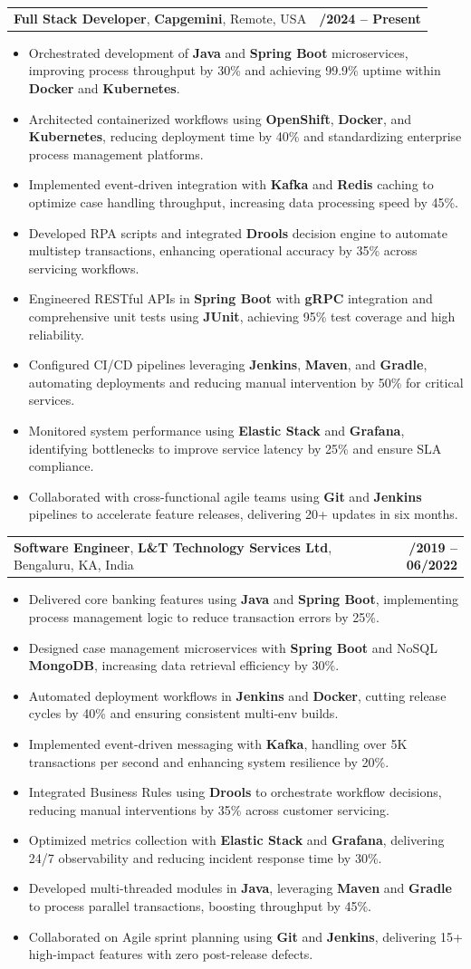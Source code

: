\documentclass[letterpaper,11pt]{article}
\makeatletter
\newcommand{\resumeItem}[1]{
  \item\footnotesize{
    {#1 \vspace{-2pt}}
  }
}
\newcommand{\resumeSubheading}[4]{
  \vspace{-2pt}\item
    \begin{tabular*}{1.0\textwidth}[t]{l@{\extracolsep{\fill}}r}
      \textbf{\fontsize{10pt}{14pt}\selectfont #3}, \textbf{\fontsize{10pt}{14pt}\selectfont #1}, \fontsize{10pt}{14pt}\selectfont #4 & \textbf{\fontsize{10pt}{14pt}\selectfont #2} \\
    \end{tabular*}\vspace{-7pt}
}
\newcommand{\resumeItemListStart}{\begin{itemize}[leftmargin=*]}
\newcommand{\resumeItemListEnd}{\end{itemize}\vspace{-5pt}}
\makeatother
\begin{document}
    \resumeSubheading
        {Capgemini}{01/2024 -- Present}
        {Full Stack Developer}{Remote, USA}
      \resumeItemListStart
        \resumeItem{Orchestrated development of \textbf{Java} and \textbf{Spring Boot} microservices, improving process throughput by 30\% and achieving 99.9\% uptime within \textbf{Docker} and \textbf{Kubernetes}.}
        \resumeItem{Architected containerized workflows using \textbf{OpenShift}, \textbf{Docker}, and \textbf{Kubernetes}, reducing deployment time by 40\% and standardizing enterprise process management platforms.}
        \resumeItem{Implemented event-driven integration with \textbf{Kafka} and \textbf{Redis} caching to optimize case handling throughput, increasing data processing speed by 45\%.}
        \resumeItem{Developed RPA scripts and integrated \textbf{Drools} decision engine to automate multistep transactions, enhancing operational accuracy by 35\% across servicing workflows.}
        \resumeItem{Engineered RESTful APIs in \textbf{Spring Boot} with \textbf{gRPC} integration and comprehensive unit tests using \textbf{JUnit}, achieving 95\% test coverage and high reliability.}
        \resumeItem{Configured CI/CD pipelines leveraging \textbf{Jenkins}, \textbf{Maven}, and \textbf{Gradle}, automating deployments and reducing manual intervention by 50\% for critical services.}
        \resumeItem{Monitored system performance using \textbf{Elastic Stack} and \textbf{Grafana}, identifying bottlenecks to improve service latency by 25\% and ensure SLA compliance.}
        \resumeItem{Collaborated with cross-functional agile teams using \textbf{Git} and \textbf{Jenkins} pipelines to accelerate feature releases, delivering 20+ updates in six months.}
      \resumeItemListEnd

    \resumeSubheading
        {L\&T Technology Services Ltd}{08/2019 -- 06/2022}
        {Software Engineer}{Bengaluru, KA, India}
      \resumeItemListStart
        \resumeItem{Delivered core banking features using \textbf{Java} and \textbf{Spring Boot}, implementing process management logic to reduce transaction errors by 25\%.}
        \resumeItem{Designed case management microservices with \textbf{Spring Boot} and NoSQL \textbf{MongoDB}, increasing data retrieval efficiency by 30\%.}
        \resumeItem{Automated deployment workflows in \textbf{Jenkins} and \textbf{Docker}, cutting release cycles by 40\% and ensuring consistent multi-env builds.}
        \resumeItem{Implemented event-driven messaging with \textbf{Kafka}, handling over 5K transactions per second and enhancing system resilience by 20\%.}
        \resumeItem{Integrated Business Rules using \textbf{Drools} to orchestrate workflow decisions, reducing manual interventions by 35\% across customer servicing.}
        \resumeItem{Optimized metrics collection with \textbf{Elastic Stack} and \textbf{Grafana}, delivering 24/7 observability and reducing incident response time by 30\%.}
        \resumeItem{Developed multi-threaded modules in \textbf{Java}, leveraging \textbf{Maven} and \textbf{Gradle} to process parallel transactions, boosting throughput by 45\%.}
        \resumeItem{Collaborated on Agile sprint planning using \textbf{Git} and \textbf{Jenkins}, delivering 15+ high-impact features with zero post-release defects.}
      \resumeItemListEnd
\end{document}
